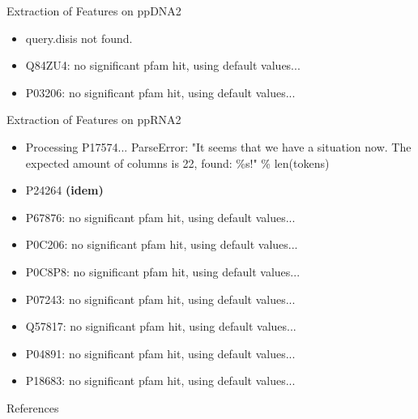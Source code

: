 \documentclass[pdf]
{beamer}
\begin{document}
\begin{frame}{Extraction of Features on ppDNA2}
	\begin{itemize}
		\item query.disis not found.
		\item Q84ZU4: no significant pfam hit, using default values...
		\item P03206: no significant pfam hit, using default values...
	\end{itemize}
\end{frame}

\begin{frame}{Extraction of Features on ppRNA2}
	\begin{itemize}
		\item Processing P17574... ParseError: "It seems that we have a situation now. The expected amount of columns is 22, found: \%s!" \% len(tokens)\\
		\item P24264 \textbf{(idem)}\\
		\item P67876: no significant pfam hit, using default values...
		\item P0C206: no significant pfam hit, using default values...
		\item P0C8P8: no significant pfam hit, using default values...
		\item P07243: no significant pfam hit, using default values...
		\item Q57817: no significant pfam hit, using default values...
		\item P04891: no significant pfam hit, using default values...
		\item P18683: no significant pfam hit, using default values...
	\end{itemize}
\end{frame}



\begin{frame}{References}

\end{frame}
\end{document}

